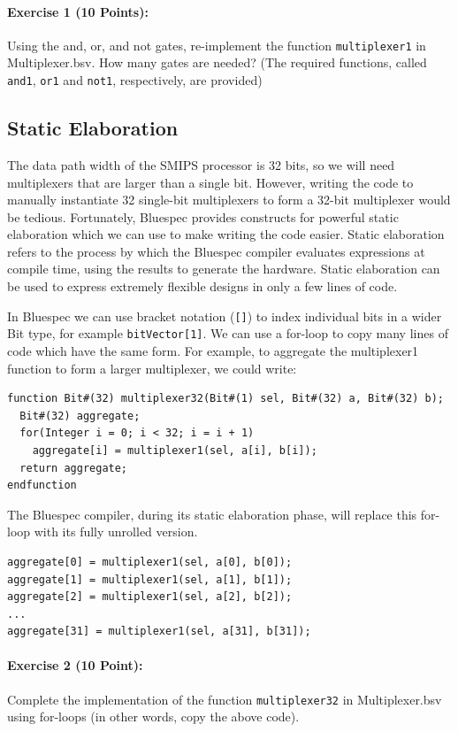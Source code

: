 \documentclass{article}
\begin{document}
\noindent \paragraph{\bf Exercise 1 (10 Points):} Using the and, or, and not gates, re-implement the
function \verb|multiplexer1| in Multiplexer.bsv. How many gates are needed?
(The required functions, called \texttt{and1}, \texttt{or1} and \texttt{not1},
respectively, are provided)

\subsection{Static Elaboration}

The data path width of the SMIPS processor is 32 bits, so we will need
multiplexers that are larger than a single bit. However, writing the code to
manually instantiate 32 single-bit multiplexers to form a 32-bit multiplexer
would be tedious. Fortunately, Bluespec provides constructs for powerful static
elaboration which we can use to make writing the code easier. Static elaboration
refers to the process by which the Bluespec compiler evaluates expressions at
compile time, using the results to generate the hardware. Static elaboration
can be used to express extremely flexible designs in only a few lines of code.

In Bluespec we can use bracket notation (\verb|[]|) to index individual bits in
a wider Bit type, for example \verb|bitVector[1]|. We can use a for-loop to
copy many lines of code which have the same form. For example, to aggregate the
multiplexer1 function to form a larger multiplexer, we could write:

\begin{verbatim}
function Bit#(32) multiplexer32(Bit#(1) sel, Bit#(32) a, Bit#(32) b);
  Bit#(32) aggregate;
  for(Integer i = 0; i < 32; i = i + 1)
    aggregate[i] = multiplexer1(sel, a[i], b[i]);
  return aggregate;
endfunction
\end{verbatim}

The Bluespec compiler, during its static elaboration phase, will replace this
for-loop with its fully unrolled version.

\begin{verbatim}
aggregate[0] = multiplexer1(sel, a[0], b[0]);
aggregate[1] = multiplexer1(sel, a[1], b[1]);
aggregate[2] = multiplexer1(sel, a[2], b[2]);
...
aggregate[31] = multiplexer1(sel, a[31], b[31]);
\end{verbatim}

\noindent \paragraph{\bf Exercise 2 (10 Point):} Complete the implementation of the function
\verb|multiplexer32| in Multiplexer.bsv using for-loops (in other words, copy
the above code).
\end{document}
